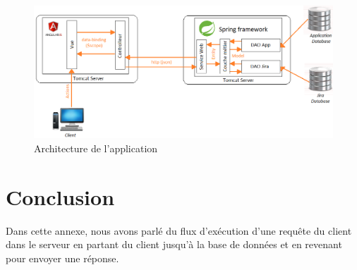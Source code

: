 \begin{figure}[H]
  \centering
  \includegraphics[scale=0.55]{figures/architecture.png}
  \caption{Architecture de l'application}
  \label{code_Architecture}
\end{figure}

\section{Conclusion}
Dans cette annexe, nous avons parlé du flux d'exécution d'une requête du client dans le serveur en partant du client jusqu'à la base de données et en revenant pour envoyer une réponse.
